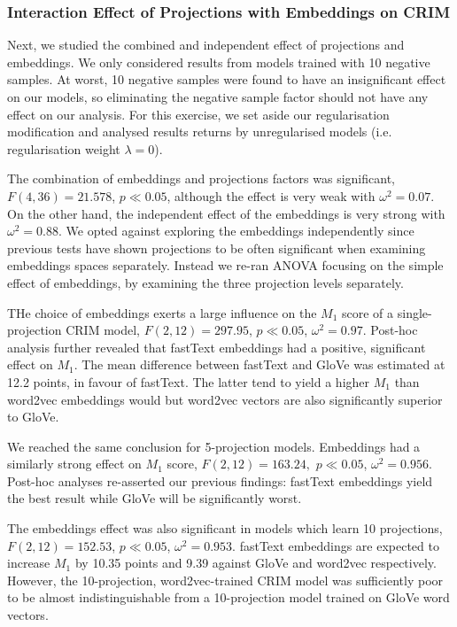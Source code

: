 \subsubsection{Interaction Effect of Projections with Embeddings on CRIM}
Next, we studied the combined and independent effect of projections and embeddings.  We only considered results from models trained with 10 negative samples.  At worst, 10 negative samples were found to have an insignificant effect on our models, so eliminating the negative sample factor should not have any effect on our analysis.  For this exercise, we set aside our regularisation modification and analysed results returns by unregularised models (i.e. regularisation weight $\lambda=0$).

The combination of embeddings and projections factors was significant, $F(4,36)=21.578$, $p \ll 0.05$, although the effect is very weak with $\omega^2=0.07$.  On the other hand, the independent effect of the embeddings is very strong with $\omega^2 = 0.88$.  We opted against exploring the embeddings independently since previous tests have shown projections to be often significant when examining embeddings spaces separately.  Instead we re-ran \ac{ANOVA} focusing on the simple effect of embeddings, by examining the three  projection levels separately.

THe choice of embeddings exerts a large influence on the $M_1$ score of a single-projection CRIM model, $F(2, 12)=297.95$, $p \ll 0.05$, $\omega^2 = 0.97$.  Post-hoc analysis further revealed that fastText embeddings had a positive, significant effect on $M_1$.  The mean difference between fastText and GloVe was estimated at 12.2 points, in favour of fastText.  The latter tend to yield a higher $M_1$ than word2vec embeddings would but word2vec vectors are also significantly superior to GloVe.

We reached the same conclusion for 5-projection models.  Embeddings had a similarly strong effect on $M_1$ score, $F(2, 12)=163.24,$ $p \ll 0.05$, $\omega^2 = 0.956$.  Post-hoc analyses re-asserted our previous findings: fastText embeddings yield the best result while GloVe will be significantly worst.

The embeddings effect was also significant in models which learn 10 projections, $F(2,12)=152.53$, $p \ll 0.05$, $\omega^2 = 0.953$.  fastText embeddings are expected to increase $M_1$ by 10.35 points and 9.39 against GloVe and word2vec respectively.  However, the 10-projection, word2vec-trained CRIM model was sufficiently poor to be almost indistinguishable from a 10-projection model trained on GloVe word vectors.

